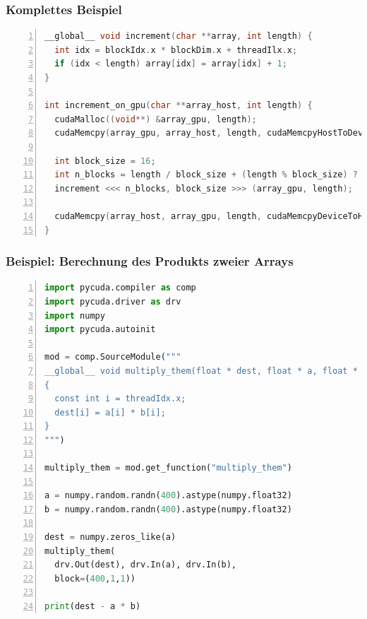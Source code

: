 \subsubsection{Komplettes Beispiel}
\begin{minipage}{\linewidth}
\begin{lstlisting}[frame=single,numbers=left,mathescape,language=C]
__global__ void increment(char **array, int length) {
  int idx = blockIdx.x * blockDim.x + threadIlx.x;
  if (idx < length) array[idx] = array[idx] + 1;
}

int increment_on_gpu(char **array_host, int length) {
  cudaMalloc((void**) &array_gpu, length);
  cudaMemcpy(array_gpu, array_host, length, cudaMemcpyHostToDevice);

  int block_size = 16;
  int n_blocks = length / block_size + (length % block_size) ? 1 : 0;
  increment <<< n_blocks, block_size >>> (array_gpu, length);

  cudaMemcpy(array_host, array_gpu, length, cudaMemcpyDeviceToHost);
}
\end{lstlisting}
\end{minipage}

\subsubsection{Beispiel: Berechnung des Produkts zweier Arrays}
\begin{minipage}{\linewidth}
\lstset{language=Python}  
\begin{lstlisting}[frame=single,numbers=left,mathescape,keepspaces=true,showstringspaces=false,language=Python]
import pycuda.compiler as comp
import pycuda.driver as drv
import numpy
import pycuda.autoinit

mod = comp.SourceModule("""
__global__ void multiply_them(float * dest, float * a, float * b)
{
  const int i = threadIdx.x;
  dest[i] = a[i] * b[i];
}
""")

multiply_them = mod.get_function("multiply_them")

a = numpy.random.randn(400).astype(numpy.float32)
b = numpy.random.randn(400).astype(numpy.float32)

dest = numpy.zeros_like(a)
multiply_them(
  drv.Out(dest), drv.In(a), drv.In(b),
  block=(400,1,1))

print(dest - a * b)
\end{lstlisting}
\end{minipage}

